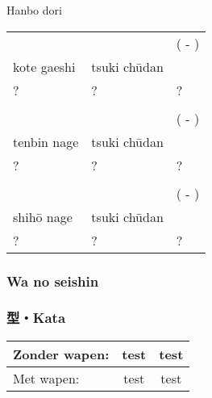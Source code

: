 Hanbo dori
\begin{table}[H]
\begin{center}
\begin{tabular}{lll}
    \ruby{}{} & \ruby{}{} & (\ruby{}{} - \ruby{}{})\\
    kote gaeshi & tsuki ch\={u}dan & \\
    ? & ? & ?\\
    \\
    \ruby{}{} & \ruby{}{} & (\ruby{}{} - \ruby{}{})\\
    tenbin nage & tsuki ch\={u}dan & \\
    ? & ? & ?\\
    \\
    \ruby{}{} & \ruby{}{} & (\ruby{}{} - \ruby{}{})\\
    shih\={o} nage & tsuki ch\={u}dan & \\ 
    ? & ? & ?
\end{tabular}
\end{center}
\label{dan_2_bukidori_hanbo}
\end{table}

\subsubsection{Wa no seishin}

\subsubsection{型・Kata}
\begin{table}[H]
\begin{center}
\begin{tabular}{lcc}
    Zonder wapen: & test & test \\
    \hline
    Met wapen: & test & test
\end{tabular}
\end{center}
\label{kata_dan_2}
\end{table}


